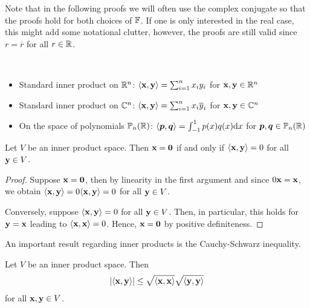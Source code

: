 \documentclass{article}
\begin{document}
Note that in the following proofs we will often use the complex conjugate so that the proofs hold for both choices of ${\mathbb{F}}$. If one is only interested in the real case, this might add some notational clutter, however, the proofs are still valid since $r = \overline{r}$ for all $r\in {\mathbb{R}}$.

\begin{example}
\textcolor{white}{skip}
\begin{itemize}
    \item Standard inner product on ${\mathbb{R}}^n$: $\langle {\mathbf{x}},{\mathbf{y}}  \rangle= \sum_{i=1}^n x_iy_i$ for ${\mathbf{x}},{\mathbf{y}}\in {\mathbb{R}}^n$
    \item Standard inner product on ${\mathbb{C}}^n$: $\langle {\mathbf{x}},{\mathbf{y}}  \rangle= \sum_{i=1}^n x_i\overline{y}_i$ for ${\mathbf{x}},{\mathbf{y}}\in {\mathbb{C}}^n$
    \item On the space of polynomials $\mathbb{P}_n({\mathbb{R}})$: $\langle \boldsymbol{p},\boldsymbol{q} \rangle = \int_{-1}^1 p(x) {q}(x) \mathrm{d}x$ for $\boldsymbol{p},\boldsymbol{q}\in \mathbb{P}_n({\mathbb{R}})$
\end{itemize}
\end{example}

\begin{proposition}\label{prop:zerovec_by_innerprod}
Let $V$ be an inner product space. Then ${\mathbf{x}} = {\mathbf{0}}$ if and only if $\langle {\mathbf{x}},{\mathbf{y}}  \rangle = 0$ for all ${\mathbf{y}} \in V$.
\end{proposition}

\begin{proof}
Suppose ${\mathbf{x}} = {\mathbf{0}}$, then by linearity in the first argument and since $0 {\mathbf{x}} = {\mathbf{x}}$, we obtain $\langle {\mathbf{x}},{\mathbf{y}}  \rangle = 0 \langle {\mathbf{x}},{\mathbf{y}}  \rangle = 0$ for all ${\mathbf{y}} \in V$.

Conversely, suppose $\langle {\mathbf{x}},{\mathbf{y}}  \rangle = 0$ for all ${\mathbf{y}} \in V$. Then, in particular, this holds for ${\mathbf{y}} = {\mathbf{x}}$ leading to $\langle {\mathbf{x}},{\mathbf{x}} \rangle = 0$. Hence, ${\mathbf{x}} = {\mathbf{0}}$ by positive definiteness. 
\end{proof}

An important result regarding inner products is the Cauchy-Schwarz inequality. 

\begin{proposition}
Let $V$ be an inner product space. Then 
\begin{align*}
    \vert \langle {\mathbf{x}},{\mathbf{y}} \rangle\vert \leq \sqrt{\langle {\mathbf{x}},{\mathbf{x}} \rangle}\sqrt{\langle {\mathbf{y}},{\mathbf{y}} \rangle}
\end{align*}
for all ${\mathbf{x}},{\mathbf{y}}\in V$.
\end{proposition}
\end{document}
